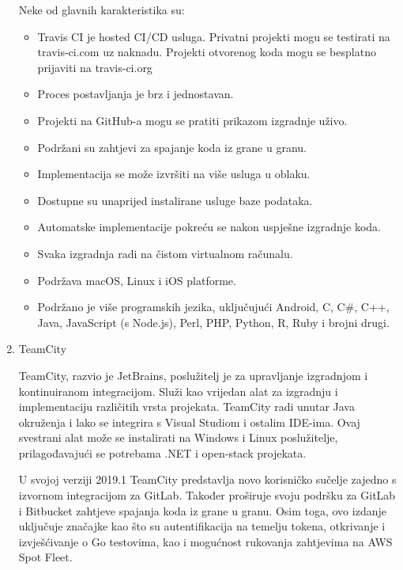 \documentclass[a4paper,12pt,oneside]{article}
\begin{document}
\begin{enumerate}
Neke od glavnih karakteristika su:
\begin{itemize}
\item Travis CI je hosted CI/CD usluga. Privatni projekti mogu se testirati na travis-ci.com uz naknadu. Projekti otvorenog koda mogu se besplatno prijaviti na travis-ci.org
\item Proces postavljanja je brz i jednostavan.
\item Projekti na GitHub-a mogu se pratiti prikazom izgradnje uživo.
\item Podržani su zahtjevi za spajanje koda iz grane u granu.
\item Implementacija se može izvršiti na više usluga u oblaku.
\item Dostupne su unaprijed instalirane usluge baze podataka.
\item Automatske implementacije pokreću se nakon uspješne izgradnje koda.
\item Svaka izgradnja radi na čistom virtualnom računalu.
\item Podržava macOS, Linux i iOS platforme.
\item Podržano je više programskih jezika, uključujući Android, C, C\#, C++, Java, JavaScript (s Node.js), Perl, PHP, Python, R, Ruby i brojni drugi.
\end{itemize}

\item 
TeamCity

TeamCity, razvio je JetBrains, poslužitelj je za upravljanje izgradnjom i kontinuiranom integracijom. Služi kao vrijedan alat za izgradnju i implementaciju različitih vrsta projekata. TeamCity radi unutar Java okruženja i lako se integrira s Visual Studiom i ostalim IDE-ima. Ovaj svestrani alat može se instalirati na Windows i Linux poslužitelje, prilagođavajući se potrebama .NET i open-stack projekata.

U svojoj verziji 2019.1 TeamCity predstavlja novo korisničko sučelje zajedno s izvornom integracijom za GitLab. Također proširuje svoju podršku za GitLab i Bitbucket zahtjeve spajanja koda iz grane u granu. Osim toga, ovo izdanje uključuje značajke kao što su autentifikacija na temelju tokena, otkrivanje i izvješćivanje o Go testovima, kao i mogućnost rukovanja zahtjevima na AWS Spot Fleet.


\end{enumerate}
\end{document}

